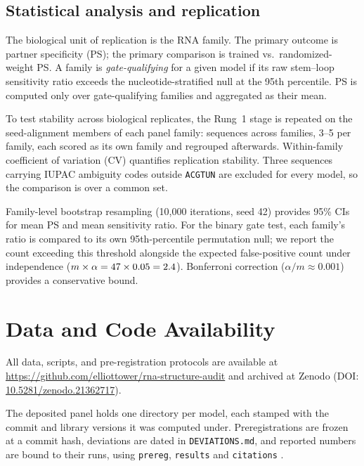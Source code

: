 \documentclass[11pt]{article}
\begin{document}
\subsection{Statistical analysis and replication}
\label{sec:stats}

The biological unit of replication is the RNA family. The primary outcome is
partner specificity (PS); the primary comparison is trained vs.\
randomized-weight PS. A family is \emph{gate-qualifying} for a given model
if its raw stem--loop sensitivity ratio exceeds the nucleotide-stratified
null at the 95th percentile. PS is computed only over gate-qualifying
families and aggregated as their mean.

To test stability across biological replicates, the Rung~1 stage is repeated on
the seed-alignment members of each panel family: \multiseqN{} sequences across
\multiseqFamilies{} families, 3--5 per family, each scored as its own family and
regrouped afterwards. Within-family coefficient of variation (CV) quantifies
replication stability. Three sequences carrying IUPAC ambiguity codes outside
\texttt{ACGTUN} are excluded for every model, so the comparison is over a common
set.

Family-level bootstrap resampling (10{,}000 iterations, seed 42)
provides 95\% CIs for mean PS and mean sensitivity ratio. For the binary
gate test, each family's ratio is compared to its own 95th-percentile
permutation null; we report the count exceeding this threshold alongside
the expected false-positive count under independence
($m \times \alpha = 47{} \times 0.05 = 2.4{}$).
Bonferroni correction
($\alpha / m \approx 0.001$) provides a conservative bound.


\section*{Data and Code Availability}

All data, scripts, and pre-registration protocols are available at
\url{https://github.com/elliottower/rna-structure-audit} and archived at
Zenodo (DOI: \href{https://doi.org/10.5281/zenodo.21362717}{10.5281/zenodo.21362717}).

The deposited panel holds one directory per model, each stamped with the commit
and library versions it was computed under. Preregistrations are frozen at a
commit hash, deviations are dated in \texttt{DEVIATIONS.md}, and reported numbers
are bound to their runs, using \texttt{prereg}, \texttt{results} and
\texttt{citations} \citep{tower2026reproducible}.
\end{document}
